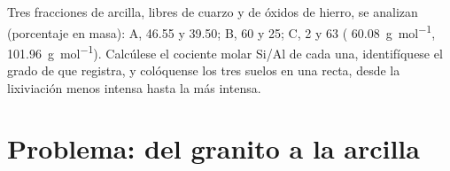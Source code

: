 \begin{exercise}[$\star\star\star$]\label{exo:b1:weathering-clays:12}
Tres fracciones de arcilla, libres de cuarzo y de óxidos de hierro, se analizan (porcentaje en masa): A,  \num{46.55} y  \num{39.50};
B,  60 y  25; C,  2 y  63 (
\qty{60.08}{g.mol^{-1}},  \qty{101.96}{g.mol^{-1}}). Calcúlese el cociente molar Si/Al de cada una, identifíquese el grado de
 que registra, y colóquense los tres suelos en una recta, desde la lixiviación menos intensa hasta la más intensa.
\end{exercise}

\section{Problema: del granito a la arcilla}

